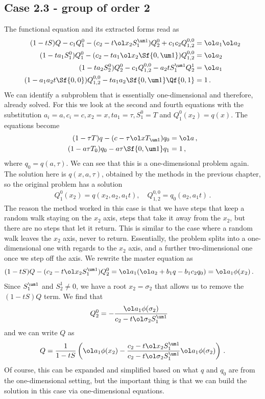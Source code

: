 \subsection{Case 2.3 - group of order 2}
The functional equation and its extracted forms read as
\begin{align}\begin{split}
(1-tS)Q - c_1 Q_1^0- (c_2 -t\ol x_2 S_1^{\um 1})Q_2^0+ c_1c_2 Q_{1,2}^{0,0}  &= \ol a_1\ol a_2\\\
(1-ta_1 S_1^0)Q_1^0 - (c_2 - ta_1 \ol x_2 \Sf{0,\um 1})Q_{1,2}^{0,0} &=\ol a_2\\
(1-ta_2 S_2^0)Q_2^0 - c_1Q_{1,2}^{0,0}  - a_2 t S_1^{\um 1} Q_2^1&=\ol a_1\\
(1-a_1 a_2 t \Sf{0,0})Q_{1,2}^{0,0} - ta_1 a_2 \Sf{0,\um 1} \Qf{0,1} &= 1\,.
\end{split}\end{align}
We can identify a subproblem that is essentially one-dimensional and therefore, already solved. For this we look at the second and fourth equations with the substitution $a_i = a, c_i = c, x_2 = x, ta_1 = \tau, S_1^0 = T$ and $Q_1^0 (x_2)= q(x)$. The equations become
\begin{align}
(1-\tau T)q - (c - \tau  \ol x T_{\um 1})q_0 &=\ol a\,,\\
(1-a \tau T_0)q_0 - a\tau \Sf{0,\um 1} q_1 &= 1\,,
\end{align}
where $q_0 = q(a,\tau)$. We can see that this is a one-dimensional problem again. The solution here is $q(x,a,\tau)$, obtained by the methods in the previous chapter, so the original problem has a solution
\begin{align}
	Q_1^0(x_2) = q(x_2,a_2,a_1t),\quad Q_{1,2}^{0,0} = q_0(a_2,a_1t)\,.
\end{align}
The reason the method worked in this case is that we have steps that keep a random walk staying on the $x_2$ axis, steps that take it away from the $x_2$, but there are no steps that let it return. This is similar to the case where a random walk leaves the $x_2$ axis, never to return. Essentially, the problem splits into a one-dimensional one with regards to the $x_2$ axis, and a further two-dimensional one once we step off the axis. We rewrite the master equation as
\begin{align}
	(1-tS)Q - (c_2 -t\ol x_2 S_1^{\um 1})Q_2^0  &= \ol a_1(\ol a_2 + b_1 q  -b_1c_2q_0)  =\ol a_1\phi(x_2)\,.
\end{align}
Since $S_1^{\um 1}$ and $S_2^1 \neq 0$, we have a root $x_2 = \sigma_2$ that allows us to remove the $(1-tS)Q$ term. We find that
\begin{align}
	Q_2^0  &=-\frac{\ol a_1\phi(\sigma_2)}{ c_2 -t\ol \sigma_2 S_1^{\um 1}}
\end{align}
and we can write $Q$ as
\begin{align}
	Q = \frac{1}{1-tS}\left(\ol a_1\phi(x_2) - \frac{c_2 -t\ol x_2 S_1^{\um 1}}{c_2 -t\ol \sigma_2 S_1^{\um 1}}\ol a_1\phi(\sigma_2)\right)\,.
\end{align}
Of course, this can be expanded and simplified based on what $q$ and $q_0$ are from the one-dimensional setting, but the important thing is that we can build the solution in this case via one-dimensional equations.

